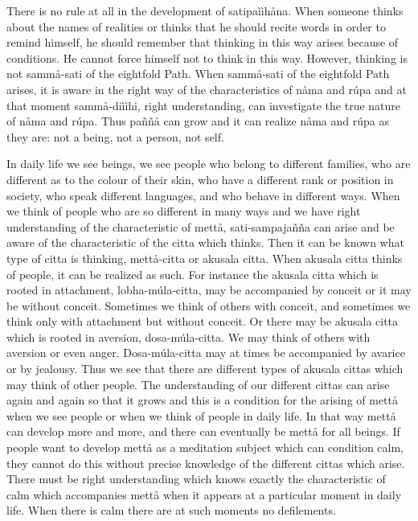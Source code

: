 \documentclass[12pt,twoside]{article}
\begin{document}
There is no rule at all in the development of satipa\`i\`ih{\aa}na. When
someone thinks about the names of realities or thinks that he should
recite words in order to remind himself, he should remember that
thinking in this way arises because of conditions. He cannot force
himself not to think in this way. However, thinking is not
samm{\aa}{}-sati of the eightfold Path. When samm{\aa}{}-sati of the
eightfold Path arises, it is aware in the right way of the
characteristics of n{\aa}ma and r\'upa and at that moment
samm{\aa}{}-di\`i\`ihi, right understanding, can investigate the true
nature of n{\aa}ma and r\'upa. Thus pa\~n\~n{\aa} can grow and it can
realize n{\aa}ma and r\'upa as they are: not a being, not a person, not
self. 

In daily life we see beings, we see people who belong to different
families, who are different as to the colour of their skin, who have a
different rank or position in society, who speak different languages,
and who behave in different ways. When we think of people who are so
different in many ways and we have right understanding of the
characteristic of mett{\aa}, sati{}-sampaja\~n\~na can arise and be
aware of the characteristic of the citta which thinks. Then it can be
known what type of citta is thinking, mett{\aa}{}-citta or akusala
citta. When akusala citta thinks of people, it can be realized as such.
For instance the akusala citta which is rooted in attachment,
lobha{}-m\'ula{}-citta, may be accompanied by conceit or it may be
without conceit. Sometimes we think of others with conceit, and
sometimes we think only with attachment but without conceit. Or there
may be akusala citta which is rooted in aversion,
dosa{}-m\'ula{}-citta. We may think of others with aversion or even
anger. Dosa{}-m\'ula{}-citta may at times be accompanied by avarice or
by jealousy. Thus we see that there are different types of akusala
cittas which may think of other people. The understanding of our
different cittas can arise again and again so that it grows and this is
a condition for the arising of mett{\aa} when we see people or when we
think of people in daily life. In that way mett{\aa} can develop more
and more, and there can eventually be mett{\aa} for all beings. If
people want to develop mett{\aa} as a meditation subject which can
condition calm, they cannot do this without precise knowledge of the
different cittas which arise. There must be right understanding which
knows exactly the characteristic of calm which accompanies mett{\aa}
when it appears at a particular moment in daily life. When there is
calm there are at such moments no defilements. 
\end{document}
